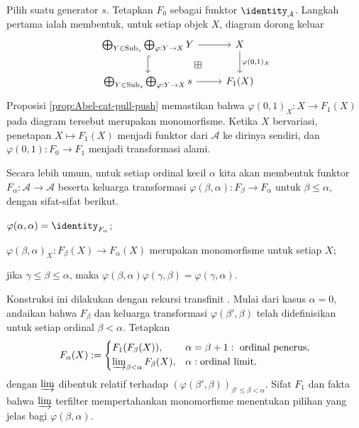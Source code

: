 \begin{bukti}
	Pilih suatu generator $s$. Tetapkan $F_0$ sebagai funktor
	$\identity_{\mathcal{A}}$. Langkah pertama ialah membentuk, untuk setiap
	objek $X$, diagram dorong keluar
	\[\begin{tikzcd}
		\bigoplus_{Y \in \mathrm{Sub}_s} \bigoplus_{\varphi: Y \to X} Y \arrow[r] \arrow[hookrightarrow, d] & X \arrow[d, "{\varphi(0, 1)_X}"] \\
		\bigoplus_{Y \in \mathrm{Sub}_s} \bigoplus_{\varphi: Y \to X} s \arrow[r] & F_1(X) \arrow[phantom, lu, "\boxplus" description]
	\end{tikzcd}\]
	Proposisi \ref{prop:Abel-cat-pull-push} memastikan bahwa
	$\varphi(0,1)_X:X\to F_1(X)$ pada diagram tersebut merupakan
	monomorfisme. Ketika $X$ bervariasi, penetapan $X\mapsto F_1(X)$
	menjadi funktor dari $\mathcal{A}$ ke dirinya sendiri, dan
	$\varphi(0,1):F_0\to F_1$ menjadi transformasi alami.

	Secara lebih umum, untuk setiap ordinal kecil $\alpha$ kita akan membentuk
	funktor $F_\alpha:\mathcal{A}\to\mathcal{A}$ beserta keluarga transformasi
	$\varphi(\beta,\alpha):F_\beta\to F_\alpha$ untuk $\beta\leq\alpha$,
	dengan sifat-sifat berikut.
	\begin{compactitem}
		\item $\varphi(\alpha,\alpha)=\identity_{F_\alpha}$;
		\item $\varphi(\beta,\alpha)_X:F_\beta(X)\to F_\alpha(X)$ merupakan
		monomorfisme untuk setiap $X$;
		\item jika $\gamma\leq\beta\leq\alpha$, maka
		$\varphi(\beta,\alpha)\varphi(\gamma,\beta)=\varphi(\gamma,\alpha)$.
	\end{compactitem}
	Konstruksi ini dilakukan dengan rekursi transfinit
	\cite[\S 1.3]{Li1}. Mulai dari kasus $\alpha=0$, andaikan bahwa
	$F_\beta$ dan keluarga transformasi $\varphi(\beta',\beta)$ telah
	didefinisikan untuk setiap ordinal $\beta<\alpha$. Tetapkan
	\[ F_\alpha(X) := \begin{cases}
		F_1(F_\beta(X)), & \alpha = \beta + 1:\ \text{ordinal penerus}, \\
		\varinjlim_{\beta < \alpha} F_\beta(X), & \alpha: \text{ordinal limit},
	\end{cases}\]
	dengan $\varinjlim$ dibentuk relatif terhadap
	$(\varphi(\beta',\beta))_{\beta'\leq\beta<\alpha}$. Sifat $F_1$ dan
	fakta bahwa $\varinjlim$ terfilter mempertahankan monomorfisme menentukan
	pilihan yang jelas bagi $\varphi(\beta,\alpha)$.


\end{bukti}
